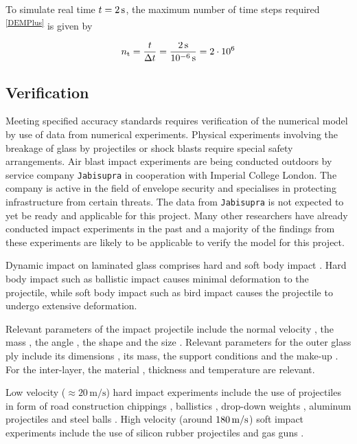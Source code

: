 \documentclass[12pt,twoside]{article}
\theoremstyle{break}
\begin{document}
To simulate real time $t=2\,{\rm{s}}$, the maximum number of time steps required \cite{Far19}\textsuperscript{\ref{DEMPlus}} is given by

\begin{equation}
    n_{\rm{t}}=\frac{t}{\Delta t}=\frac{2\,{\rm{s}}}{10^{-6}\,{\rm{s}}}=2\cdot10^6
\end{equation}

\subsection{Verification}
\label{subsec:Verification}

Meeting specified accuracy standards \cite{Sto15} requires verification of the numerical model by use of data from numerical experiments. Physical experiments involving the breakage of glass by projectiles or shock blasts require special safety arrangements. Air blast impact experiments are being conducted outdoors by service company \texttt{Jabisupra} \cite{Jab16} in cooperation with Imperial College London. The company is active in the field of envelope security and specialises in protecting infrastructure from certain threats. The data from \texttt{Jabisupra} is not expected to yet be ready and applicable for this project. Many other researchers have already conducted impact experiments in the past and a majority of the findings from these experiments are likely to be applicable to verify the model for this project.

\bigbreak
Dynamic impact on laminated glass comprises hard and soft body impact \cite{Moh17}. Hard body impact such as ballistic impact \cite{Bra10} causes minimal deformation to the projectile, while soft body impact such as bird impact \cite{Moh17} causes the projectile to undergo extensive deformation.

\bigbreak
Relevant parameters of the impact projectile include the normal velocity \cite{Gra98, Kar14, Dar13, Wu14}, the mass \cite{Kar14, Dar13}, the angle \cite{Gra98, Kar14, Dar13}, the shape \cite{Dar13} and the size \cite{Wu14}. Relevant parameters for the outer glass ply include its dimensions \cite{Wan18}, its mass, the support conditions \cite{Wan18} and the make-up \cite{Wan18}. For the inter-layer, the material \cite{Moh18, Wan18, Mon04}, thickness \cite{Ji98, Kar14, Wan18} and temperature \cite{Moh18, Zha19} are relevant.

\bigbreak
Low velocity ($\approx 20\,\mathrm{m}/\mathrm{s}$) hard impact experiments include the use of projectiles in form of road construction chippings \cite{Gra98}, ballistics \cite{Mon04}, drop-down weights \cite{Che15, Mil12, Wan18}, aluminum projectiles \cite{Mil12} and steel balls \cite{Beh99, Flo98, Wan18}. High velocity (around $180\, {\rm{m}}/{\rm{s}}$) soft impact experiments include the use of silicon rubber projectiles \cite{Moh17} and gas guns \cite{Moh18}.
\end{document}
